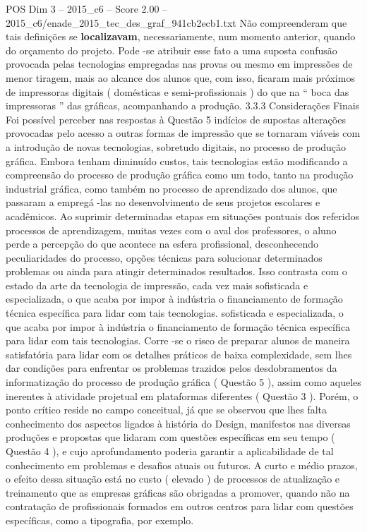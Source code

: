 \begin{textsample}{POS Dim 3 – 2015\_c6 – Score 2.00 – 2015\_c6/enade\_2015\_tec\_des\_graf\_941cb2ecb1.txt}
Não compreenderam que tais definições se \textbf{localizavam}, necessariamente, num momento anterior, quando do orçamento do projeto.
Pode -se atribuir esse fato a uma suposta confusão provocada pelas tecnologias empregadas nas provas ou mesmo em impressões de menor tiragem, mais ao alcance dos alunos que, com isso, ficaram mais próximos de impressoras digitais ( domésticas e semi-profissionais ) do que na “ boca das impressoras ” das gráficas, acompanhando a produção. 3.3.3 Considerações Finais Foi possível perceber nas respostas à Questão 5 indícios de supostas alterações provocadas pelo acesso a outras formas de impressão que se tornaram viáveis com a introdução de novas tecnologias, sobretudo digitais, no processo de produção gráfica.
Embora tenham diminuído custos, tais tecnologias estão modificando a compreensão do processo de produção gráfica como um todo, tanto na produção industrial gráfica, como também no processo de aprendizado dos alunos, que passaram a empregá -las no desenvolvimento de seus projetos escolares e acadêmicos.
Ao suprimir determinadas etapas em situações pontuais dos referidos processos de aprendizagem, muitas vezes com o aval dos professores, o aluno perde a percepção do que acontece na esfera profissional, desconhecendo peculiaridades do processo, opções técnicas para solucionar determinados problemas ou ainda para atingir determinados resultados.
Isso contrasta com o estado da arte da tecnologia de impressão, cada vez mais sofisticada e especializada, o que acaba por impor à indústria o financiamento de formação técnica específica para lidar com tais tecnologias. sofisticada e especializada, o que acaba por impor à indústria o financiamento de formação técnica específica para lidar com tais tecnologias.
Corre -se o risco de preparar alunos de maneira satisfatória para lidar com os detalhes práticos de baixa complexidade, sem lhes dar condições para enfrentar os problemas trazidos pelos desdobramentos da informatização do processo de produção gráfica ( Questão 5 ), assim como aqueles inerentes à atividade projetual em plataformas diferentes ( Questão 3 ).
Porém, o ponto crítico reside no campo conceitual, já que se observou que lhes falta conhecimento dos aspectos ligados à história do Design, manifestos nas diversas produções e propostas que lidaram com questões específicas em seu tempo ( Questão 4 ), e cujo aprofundamento poderia garantir a aplicabilidade de tal conhecimento em problemas e desafios atuais ou futuros.
A curto e médio prazos, o efeito dessa situação está no custo ( elevado ) de processos de atualização e treinamento que as empresas gráficas são obrigadas a promover, quando não na contratação de profissionais formados em outros centros para lidar com questões específicas, como a tipografia, por exemplo.

\end{textsample}
